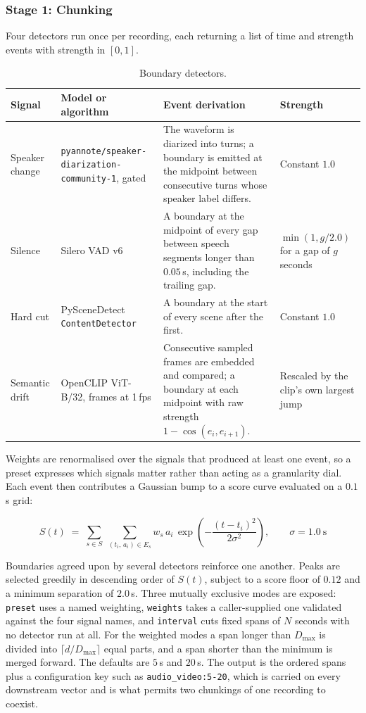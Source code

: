 \documentclass[11pt,a4paper]{article}
\begin{document}
\subsubsection*{Stage 1: Chunking}

Four detectors run once per recording, each returning a list of time and
strength events with strength in $[0,1]$.

\begin{table}[htbp]
\centering
\small
\begin{tabularx}{\textwidth}{@{}L{1.8cm}L{3.3cm}XL{2.3cm}@{}}
\toprule
\textbf{Signal} & \textbf{Model or algorithm} & \textbf{Event derivation} & \textbf{Strength} \\
\midrule
Speaker change & \texttt{pyannote/speaker-\allowbreak diarization-\allowbreak community-1}, gated &
The waveform is diarized into turns; a boundary is emitted at the midpoint
between consecutive turns whose speaker label differs. & Constant $1.0$ \\
Silence & Silero VAD v6 &
A boundary at the midpoint of every gap between speech segments longer than
$0.05$\,s, including the trailing gap. & $\min(1, g/2.0)$ for a gap of $g$
seconds \\
Hard cut & PySceneDetect \texttt{ContentDetector} &
A boundary at the start of every scene after the first. & Constant $1.0$ \\
Semantic drift & OpenCLIP ViT-B/32, frames at 1\,fps &
Consecutive sampled frames are embedded and compared; a boundary at each
midpoint with raw strength $1-\cos(e_i, e_{i+1})$. & Rescaled by the clip's own
largest jump \\
\bottomrule
\end{tabularx}
\caption{Boundary detectors.}
\end{table}

Weights are renormalised over the signals that produced at least one event, so a
preset expresses which signals matter rather than acting as a granularity dial.
Each event then contributes a Gaussian bump to a score curve evaluated on a
$0.1$\,s grid:

\[
S(t) \;=\; \sum_{s \in S} \; \sum_{(t_i,\, a_i) \in E_s}
w_s \, a_i \, \exp\!\left(-\frac{(t - t_i)^2}{2\sigma^2}\right),
\qquad \sigma = 1.0\ \mathrm{s}
\]

Boundaries agreed upon by several detectors reinforce one another. Peaks are
selected greedily in descending order of $S(t)$, subject to a score floor of
$0.12$ and a minimum separation of $2.0$\,s. Three mutually exclusive modes are
exposed: \texttt{preset} uses a named weighting, \texttt{weights} takes a
caller-supplied one validated against the four signal names, and
\texttt{interval} cuts fixed spans of $N$ seconds with no detector run at all.
For the weighted modes a span longer than $D_{\max}$ is divided into
$\lceil d / D_{\max}\rceil$ equal parts, and a span shorter than the minimum is
merged forward. The defaults are $5$\,s and $20$\,s. The output is the ordered
spans plus a configuration key such as \texttt{audio\_video:5-20}, which is
carried on every downstream vector and is what permits two chunkings of one
recording to coexist.
\end{document}
